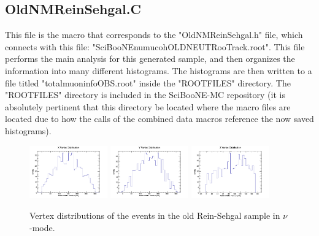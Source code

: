 \documentclass[11pt]{article}
\begin{document}
\subsection{OldNMReinSehgal.C}
This file is the macro that corresponds to the "OldNMReinSehgal.h" file, which connects with this file: "SciBooNE\textunderscore numu\textunderscore coh\textunderscore OLDNEUT\textunderscore RooTrack.root". This file performs the main analysis for this generated sample, and then organizes the information into many different histograms. The histograms are then written to a file titled "totalmuoninfoOBS.root" inside the "ROOTFILES" directory. The "ROOTFILES" directory is included in the SciBooNE-MC repository (it is absolutely pertinent that this directory be located where the macro files are located due to how the calls of the combined data macros reference the now saved histograms).

\begin{figure}[H]
\centering
\includegraphics[width=0.3\textwidth]{OldNMReinSehgalImages/4-XVertexDistributionNMORS.png}
\includegraphics[width=0.3\textwidth]{OldNMReinSehgalImages/3-YVertexDistributionNMORS.png}
\includegraphics[width=0.3\textwidth]{OldNMReinSehgalImages/2-ZVertexDistributionNMORS.png}
\caption{Vertex distributions of the events in the old Rein-Sehgal sample in $\nu$-mode.}
\end{figure}
\end{document}

